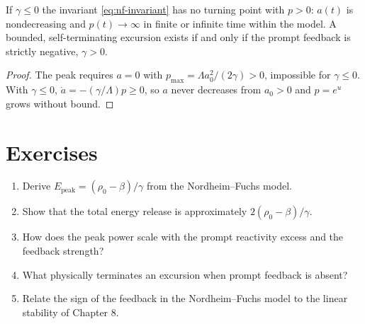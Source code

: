 \begin{corollary}
If $\gamma\le0$ the invariant \eqref{eq:nf-invariant} has no turning point with
$p>0$: $a(t)$ is nondecreasing and $p(t)\to\infty$ in finite or infinite time
within the model. A bounded, self-terminating excursion exists if and only if the
prompt feedback is strictly negative, $\gamma>0$.
\end{corollary}
\begin{proof}
The peak requires $a=0$ with $p_{\max}=\Lambda a_0^2/(2\gamma)>0$, impossible for
$\gamma\le0$. With $\gamma\le0$, $\dot a=-(\gamma/\Lambda)p\ge0$, so $a$ never
decreases from $a_0>0$ and $p=e^{u}$ grows without bound.
\end{proof}


\section*{Exercises}
\begin{enumerate}[leftmargin=*,itemsep=2pt]
\item Derive $E_{\text{peak}}=(\rho_0-\beta)/\gamma$ from the Nordheim--Fuchs model.
\item Show that the total energy release is approximately $2(\rho_0-\beta)/\gamma$.
\item How does the peak power scale with the prompt reactivity excess and the feedback strength?
\item What physically terminates an excursion when prompt feedback is absent?
\item Relate the sign of the feedback in the Nordheim--Fuchs model to the linear stability of Chapter 8.
\end{enumerate}
